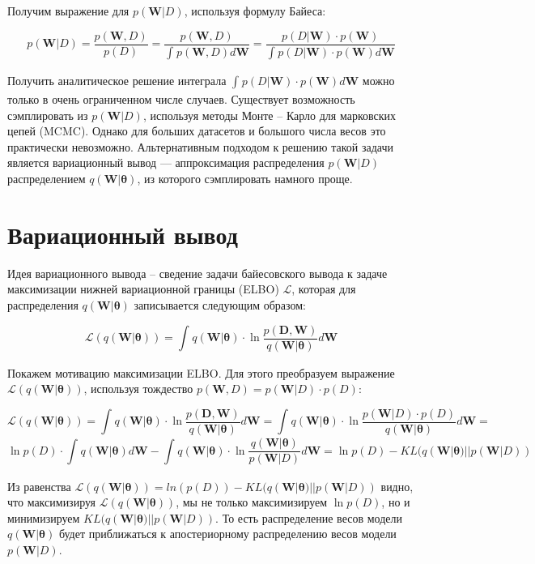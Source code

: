 \documentclass{article}
\begin{document}
Получим выражение для $p(\mathbf{W}| D)$, используя формулу Байеса:

\[
p(\mathbf{W}| D) =
\dfrac{p(\mathbf{W}, D)}{p(D)} =
\dfrac{p(\mathbf{W}, D)}{\int_{}{} p(\mathbf{W}, D) d\mathbf{W}} =
\dfrac{p(D | \mathbf{W}) \cdot p(\mathbf{W})}{\int_{}{} p(D | \mathbf{W}) \cdot p(\mathbf{W}) d\mathbf{W}}
\]

Получить аналитическое решение интеграла $\int_{}{} p(D | \mathbf{W}) \cdot p(\mathbf{W}) d\mathbf{W}$ можно только в очень ограниченном числе случаев. Существует возможность сэмплировать из $p(\mathbf{W}| D)$, используя методы Монте -- Карло для марковских цепей (MCMC). Однако для больших датасетов и большого числа весов это практически невозможно. Альтернативным подходом к решению такой задачи является вариационный вывод --- аппроксимация распределения $p(\mathbf{W}| D)$ распределением $q(\mathbf{W} | \pmb{\theta})$, из которого сэмплировать намного проще.


\section{Вариационный вывод}
Идея вариационного вывода -- сведение задачи байесовского вывода к задаче максимизации нижней вариационной границы (ELBO) $\mathcal{L}$, которая для распределения $q(\mathbf{W} | \pmb{\theta})$ записывается следующим образом:

\[
\mathcal{L}(q(\mathbf{W} | \pmb{\theta})) =
\int_{}{} q(\mathbf{W} | \pmb{\theta}) \cdot \ln{\dfrac{p(\mathbf{D}, \mathbf{W})}{q(\mathbf{W} | \pmb{\theta})}} d\mathbf{W}
\]

Покажем мотивацию максимизации ELBO. Для этого преобразуем выражение $\mathcal{L}(q(\mathbf{W} | \pmb{\theta}))$, используя тождество $p(\mathbf{W}, D) = p(\mathbf{W}| D)\cdot p(D)$:

\[
\mathcal{L}(q(\mathbf{W} | \pmb{\theta})) =
\int_{}{} q(\mathbf{W} | \pmb{\theta}) \cdot \ln{\dfrac{p(\mathbf{D}, \mathbf{W})}{q(\mathbf{W} | \pmb{\theta})}} d\mathbf{W} =
\int_{}{} q(\mathbf{W} | \pmb{\theta}) \cdot \ln{\dfrac{p(\mathbf{W}| D) \cdot p(D)}{q(\mathbf{W} | \pmb{\theta})}} d\mathbf{W} =
\]\[
\ln{p(D)} \cdot \int_{}{} q(\mathbf{W} | \pmb{\theta}) d\mathbf{W} - \int_{}{} q(\mathbf{W} | \pmb{\theta})\cdot \ln{\dfrac{q(\mathbf{W} | \pmb{\theta})}{p(\mathbf{W}| D)}} d\mathbf{W} =
\ln{p(D)} - KL(q(\mathbf{W} | \pmb{\theta}) || p(\mathbf{W}| D))
\]

Из равенства $\mathcal{L}(q(\mathbf{W} | \pmb{\theta})) = ln(p(D)) - KL(q(\mathbf{W} | \pmb{\theta}) || p(\mathbf{W}| D))$ видно, что максимизируя $\mathcal{L}(q(\mathbf{W} | \pmb{\theta}))$, мы не только максимизируем $\ln {p(D)}$, но и минимизируем $KL(q(\mathbf{W} | \pmb{\theta}) || p(\mathbf{W}| D))$. То есть распределение весов модели $q(\mathbf{W} | \pmb{\theta})$ будет приближаться к апостериорному распределению весов модели $p(\mathbf{W}| D)$.
\end{document}
